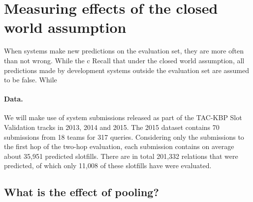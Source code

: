 \section{Measuring effects of the closed world assumption}
\label{sec:analysis}

When systems make new predictions on the evaluation set, they are more often than not wrong.
While the c
Recall that under the closed world assumption, all predictions made by development systems outside the evaluation set are assumed to be false.
While 


\paragraph{Data.}
We will make use of system submissions released as part of the TAC-KBP Slot Validation tracks in 2013, 2014 and 2015.
The 2015 dataset contains 70 submissions from 18 teams for 317 queries.
Considering only the submissions to the first hop of the two-hop  evaluation,
each submission contains on average about 35,951 predicted slotfills. 
There are in total 201,332 relations that were predicted, of which only 11,008 of these slotfills have were evaluated.

\subsection{What is the effect of pooling?}

